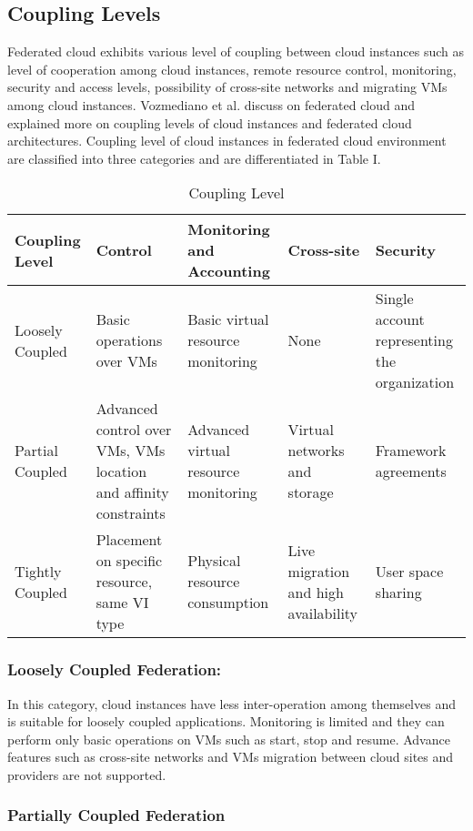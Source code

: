 \documentclass[conference]{IEEEtran}
\begin{document}
\subsection{Coupling Levels}
Federated cloud exhibits various level of coupling between cloud instances such as level of cooperation among cloud instances, remote resource control, monitoring, security and access levels, possibility of cross-site networks and migrating VMs among cloud instances. Vozmediano et al. \cite {6165242} discuss on federated cloud and explained more on coupling levels of cloud instances and federated cloud architectures. Coupling level of cloud instances in federated cloud environment are classified into three categories and are differentiated in Table I.
\begin{table*}[!t]
\caption{Coupling Level}
\renewcommand{\arraystretch}{1.3}

\centering
\begin{tabular}{|p{2.5 cm}|p{3.5 cm}|p{3.5 cm}|p{3 cm}|p{3 cm}|}
\hline

\bfseries
Coupling Level &\bfseries Control &\bfseries Monitoring and Accounting &\bfseries Cross-site &\bfseries Security \\ 
\hline \hline 
Loosely Coupled & Basic operations over VMs & Basic virtual resource monitoring & None & Single account representing the organization \\ 
\hline
Partial Coupled & Advanced control over VMs, VMs location and affinity constraints & Advanced virtual resource monitoring & Virtual networks and storage & Framework agreements \\ 
\hline
Tightly Coupled & Placement on specific resource, same VI type & Physical resource consumption & Live migration and high availability & User space sharing \\ 
\hline

\hline
\end{tabular}
\end{table*} 
\subsubsection{Loosely Coupled Federation:} 
In this category, cloud instances have less inter-operation among themselves and is suitable for loosely coupled applications. Monitoring is limited and they can perform only basic operations on VMs such as start, stop and resume. Advance features such as cross-site networks and VMs migration between cloud sites and providers are not supported.
\subsubsection{Partially Coupled Federation}
\end{document}
